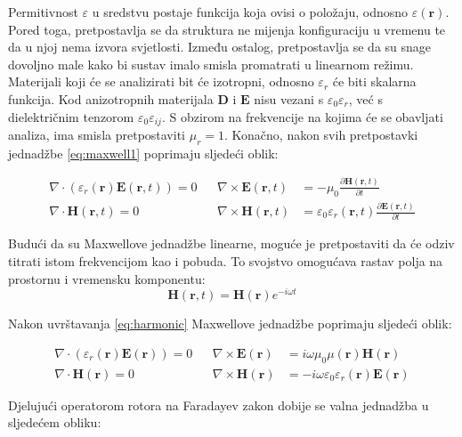 \documentclass[utf8, seminar, numeric]{fer}
\begin{document}
Permitivnost $\varepsilon$ u sredstvu postaje funkcija koja ovisi o položaju,
odnosno $\varepsilon(\mathbf{r})$. Pored toga, pretpostavlja se da struktura ne
mijenja konfiguraciju u vremenu te da u njoj nema izvora svjetlosti. Između
ostalog, pretpostavlja se da su snage dovoljno male kako bi sustav imalo smisla
promatrati u linearnom režimu. Materijali koji će se analizirati bit će
izotropni, odnosno $\varepsilon_r$ će biti skalarna funkcija. Kod
anizotropnih materijala $\mathbf{D}$ i $\mathbf{E}$ nisu vezani s
$\varepsilon_0 \varepsilon_r$, već s dielektričnim tenzorom
$\varepsilon_0 \varepsilon_{ij}$. S obzirom na frekvencije na kojima će se
obavljati analiza, ima smisla pretpostaviti $\mu_r = 1$. Konačno, nakon svih
pretpostavki jednadžbe \ref{eq:maxwell1} poprimaju sljedeći oblik:

\begin{align} \label{eq:maxwell2}
	\nabla \cdot (\varepsilon_r(\mathbf{r}) \mathbf{E}(\mathbf{r}, t)) = 0 &&
	\nabla \times \mathbf{E}(\mathbf{r}, t) &=
		- \mu_0
		\frac{\partial \mathbf{H}(\mathbf{r}, t)}{\partial t}  \nonumber \\
	\nabla \cdot \mathbf{H}(\mathbf{r}, t) = 0 &&
	\nabla \times \mathbf{H}(\mathbf{r}, t) &=
		\varepsilon_0 \varepsilon_r(\mathbf{r}, t)
		\frac{\partial \mathbf{E}(\mathbf{r}, t)}{\partial t}
\end{align}

Budući da su Maxwellove jednadžbe linearne, moguće je pretpostaviti da će odziv
titrati istom frekvencijom kao i pobuda. To svojstvo omogućava rastav polja
na prostornu i vremensku komponentu:
\begin{equation} \label{eq:harmonic}
	\mathbf{H}(\mathbf{r}, t) = \mathbf{H}(\mathbf{r}) e^{-i \omega t}
\end{equation}

Nakon uvrštavanja \ref{eq:harmonic} Maxwellove jednadžbe poprimaju sljedeći
oblik:

\begin{align} \label{eq:maxwell3}
	\nabla \cdot (\varepsilon_r(\mathbf{r}) \mathbf{E}(\mathbf{r})) = 0 &&
	\nabla \times \mathbf{E}(\mathbf{r}) &=
		i \omega \mu_0 \mu(\mathbf{r})\mathbf{H}(\mathbf{r})  \nonumber \\
	\nabla \cdot \mathbf{H}(\mathbf{r}) = 0 &&
	\nabla \times \mathbf{H}(\mathbf{r}) &=
		- i \omega \varepsilon_0 \varepsilon_r(\mathbf{r})\mathbf{E}(\mathbf{r})
\end{align}

Djelujući operatorom rotora na Faradayev zakon dobije se valna jednadžba u
sljedećem obliku:
\end{document}
